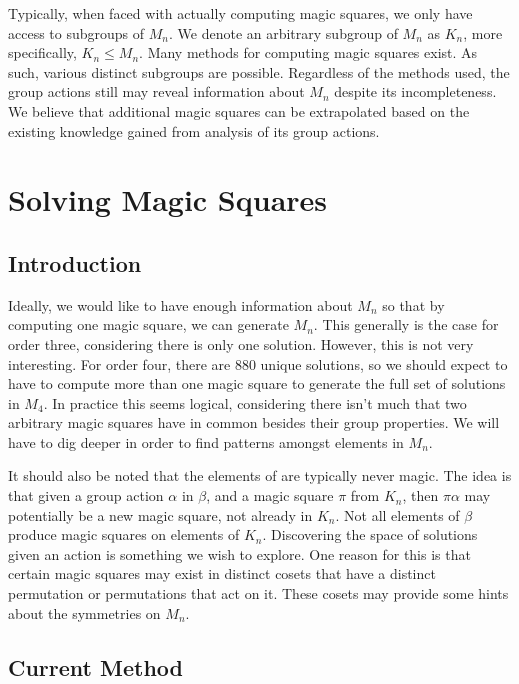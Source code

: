 \documentclass[12pt]{report}
\begin{document}
\par Typically, when faced with actually computing magic squares, we only have access to subgroups
of $M_n$. We denote an arbitrary subgroup of $M_n$ as $K_n$, more specifically, $K_n \leq M_n$.
Many methods for computing magic squares exist. As such, various distinct subgroups are possible.
Regardless of the methods used, the group actions still may reveal information about $M_n$ despite
its incompleteness. We believe that additional magic squares can be extrapolated based on the
existing knowledge gained from analysis of its group actions.

\chapter{Solving Magic Squares}

\section{Introduction}

\par Ideally, we would like to have enough information about $M_n$ so that by computing one magic
square, we can generate $M_n$. This generally is the case for order three, considering there is
only one solution. However, this is not very interesting. For order four, there are 880 unique
solutions, so we should expect to have to compute more than one magic square to generate the full
set of solutions in $M_4$. In practice this seems logical, considering there isn't much that two
arbitrary magic squares have in common besides their group properties. We will have to dig deeper
in order to find patterns amongst elements in $M_n$.

\par It should also be noted that the elements of  are typically never magic. The idea is that
given a group action $\alpha$ in $\beta$, and a magic square $\pi$ from $K_n$, then $\pi\alpha$ may
potentially be a new magic square, not already in $K_n$. Not all elements of $\beta$ produce magic
squares on elements of $K_n$. Discovering the space of solutions given an action is something we
wish to explore. One reason for this is that certain magic squares may exist in distinct cosets
that have a distinct permutation or permutations that act on it. These cosets may provide some
hints about the symmetries on $M_n$.

\section{Current Method}
\end{document}
